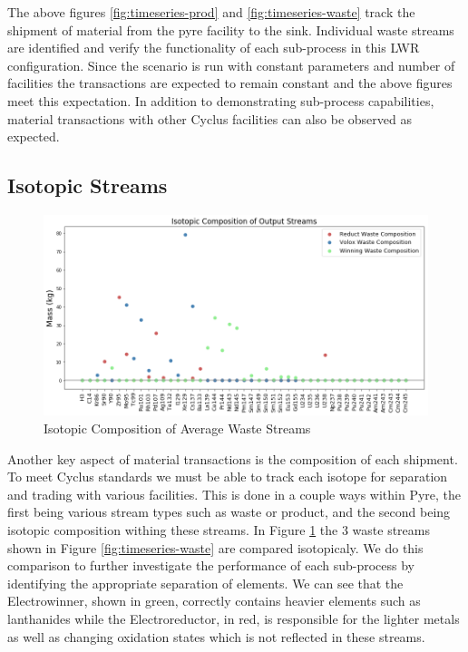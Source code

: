 The above figures \ref{fig:timeseries-prod} and \ref{fig:timeseries-waste} track the shipment of material from the pyre facility to the sink.
Individual waste streams are identified and verify the functionality of each sub-process in this LWR configuration. Since the scenario is run with
constant parameters and number of facilities the transactions are expected to remain constant and the above figures meet this expectation.
In addition to demonstrating sub-process capabilities, material transactions with other Cyclus facilities can also be observed as expected.

\subsection{Isotopic Streams}
\begin{figure} [h]
	\centering
	\includegraphics[width=\linewidth]{images/avg-isotope-comp}
	\caption{Isotopic Composition of Average Waste Streams}
	\label{fig:avg-isotope-comp}
\end{figure}

Another key aspect of material transactions is the composition of each shipment. To meet Cyclus standards we must be able to track each isotope for
separation and trading with various facilities. This is done in a couple ways within Pyre, the first being various stream types such as waste or product,
and the second being isotopic composition withing these streams. In Figure \ref{fig:avg-isotope-comp} the 3 waste streams shown in Figure \ref{fig:timeseries-waste}
are compared isotopicaly. We do this comparison to further investigate the performance of each sub-process by identifying the appropriate separation of elements.
We can see that the Electrowinner, shown in green, correctly contains heavier elements such as lanthanides while the Electroreductor, in red, is responsible for the lighter metals
as well as changing oxidation states which is not reflected in these streams.

